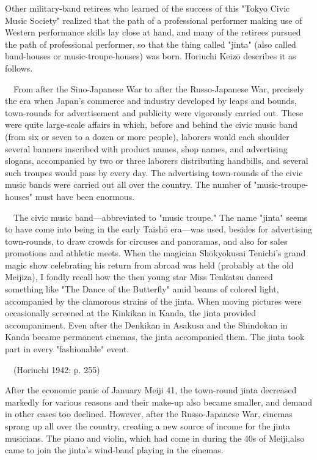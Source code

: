 Other military-band retirees who learned of the success of this "Tokyo Civic Music Society" realized that the path of a professional performer making use of Western performance skills lay close at hand, and many of the retirees pursued the path of professional performer, so that the thing called "jinta" (also called band-houses or music-troupe-houses) was born. Horiuchi Keizō describes it as follows.

\begin{gquote}
　From after the Sino-Japanese War to after the Russo-Japanese War, precisely the era when Japan's commerce and industry developed by leaps and bounds, town-rounds for advertisement and publicity were vigorously carried out. These were quite large-scale affairs in which, before and behind the civic music band (from six or seven to a dozen or more people), laborers would each shoulder several banners inscribed with product names, shop names, and advertising slogans, accompanied by two or three laborers distributing handbills, and several such troupes would pass by every day. The advertising town-rounds of the civic music bands were carried out all over the country. The number of "music-troupe-houses" must have been enormous.\par{}　The civic music band—abbreviated to "music troupe." The name "jinta" seems to have come into being in the early Taishō era—was used, besides for advertising town-rounds, to draw crowds for circuses and panoramas, and also for sales promotions and athletic meets. When the magician Shōkyokusai Tenichi's grand magic show celebrating his return from abroad was held (probably at the old Meijiza), I fondly recall how the then young star Miss Tenkatsu danced something like "The Dance of the Butterfly" amid beams of colored light, accompanied by the clamorous strains of the jinta. When moving pictures were occasionally screened at the Kinkikan in Kanda, the jinta provided accompaniment. Even after the Denkikan in Asakusa and the Shindokan in Kanda became permanent cinemas, the jinta accompanied them. The jinta took part in every "fashionable" event.\par{}　(Horiuchi 1942: p. 255)
\end{gquote}

After the economic panic of January Meiji 41, the town-round jinta decreased markedly for various reasons and their make-up also became smaller, and demand in other cases too declined. However, after the Russo-Japanese War, cinemas sprang up all over the country, creating a new source of income for the jinta musicians. The piano and violin, which had come in during the 40s of Meiji,also came to join the jinta's wind-band playing in the cinemas.

